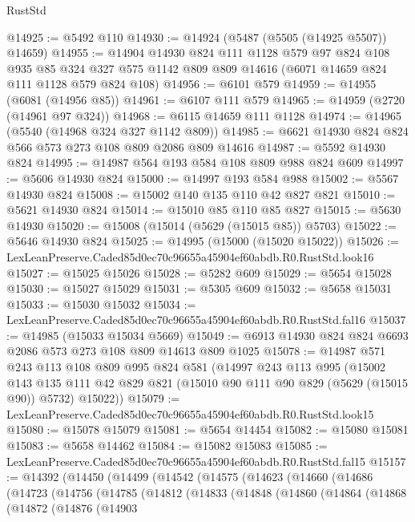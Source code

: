 \begin{lexlean}{RustStd}
\begin{coremodule}
@14925 := @5492 @110
@14930 := @14924 (@5487 (@5505 (@14925 @5507)) @14659)
@14955 := @14904
    @14930
    @824
    @111
    @1128
    @579
    @97
    @824
    @108
    @935
    @85
    @324
    @327
    @575
    @1142
    @809
    @809
    @14616
    (@6071 @14659 @824 @111 @1128 @579 @824 @108)
@14956 := @6101 @579
@14959 := @14955 (@6081 (@14956 @85))
@14961 := @6107 @111 @579
@14965 := @14959 (@2720 (@14961 @97 @324))
@14968 := @6115 @14659 @111 @1128
@14974 := @14965 (@5540 (@14968 @324 @327 @1142 @809))
@14985 := @6621 @14930 @824 @824 @566 @573 @273 @108 @809 @2086 @809 @14616
@14987 := @5592 @14930 @824
@14995 := @14987 @564 @193 @584 @108 @809 @988 @824 @609
@14997 := @5606 @14930 @824
@15000 := @14997 @193 @584 @988
@15002 := @5567 @14930 @824
@15008 := @15002 @140 @135 @110 @42 @827 @821
@15010 := @5621 @14930 @824
@15014 := @15010 @85 @110 @85 @827
@15015 := @5630 @14930
@15020 := @15008 (@15014 (@5629 (@15015 @85)) @5703)
@15022 := @5646 @14930 @824
@15025 := @14995 (@15000 (@15020 @15022))
@15026 := LexLeanPreserve.Caded85d0ec70c96655a45904ef60abdb.R0.RustStd.look16
@15027 := @15025 @15026
@15028 := @5282 @609
@15029 := @5654 @15028
@15030 := @15027 @15029
@15031 := @5305 @609
@15032 := @5658 @15031
@15033 := @15030 @15032
@15034 := LexLeanPreserve.Caded85d0ec70c96655a45904ef60abdb.R0.RustStd.fal16
@15037 := @14985 (@15033 @15034 @5669)
@15049 := @6913 @14930 @824 @824 @6693 @2086 @573 @273 @108 @809 @14613 @809 @1025
@15078 := @14987
    @571
    @243
    @113
    @108
    @809
    @995
    @824
    @581
    (@14997
      @243
      @113
      @995
      (@15002
        @143
        @135
        @111
        @42
        @829
        @821
        (@15010 @90 @111 @90 @829 (@5629 (@15015 @90)) @5732)
        @15022))
@15079 := LexLeanPreserve.Caded85d0ec70c96655a45904ef60abdb.R0.RustStd.look15
@15080 := @15078 @15079
@15081 := @5654 @14454
@15082 := @15080 @15081
@15083 := @5658 @14462
@15084 := @15082 @15083
@15085 := LexLeanPreserve.Caded85d0ec70c96655a45904ef60abdb.R0.RustStd.fal15
@15157 := @14392
    (@14450
      (@14499
        (@14542
          (@14575
            (@14623
              (@14660
                (@14686
                  (@14723
                    (@14756
                      (@14785
                        (@14812
                          (@14833
                            (@14848
                              (@14860
                                (@14864
                                  (@14868
                                    (@14872
                                      (@14876
                                        (@14903

\end{coremodule}
\end{lexlean}
